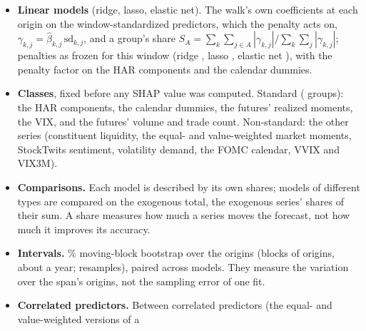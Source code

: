 \begin{itemize}
  forecast, add up to it, and a group's value sums its predictors' values:
  \[
    \hat y_{t,i} = \phi_{k,0} + \sum_{j=1}^{p} \phi_{t,i,j}, \qquad
    \phi_{t,i,A} = \sum_{j \in A} \phi_{t,i,j}, \qquad
    s_A = \frac{I_A}{\sum_{B} I_B}, \quad I_A = \frac{1}{|\mathcal O|} \sum_{(t,i) \in \mathcal O} |\phi_{t,i,A}| ,
  \]
  with $\phi_{k,0}$ the model's expected forecast over its own training sample (the trees' node covers), so no
  background sample is chosen.
\item \textbf{Linear models} (ridge, lasso, elastic net). The walk's own coefficients at each origin on the
  window-standardized predictors, which the penalty acts on, $\gamma_{k,j} = \hat\beta_{k,j}\,\mathrm{sd}_{k,j}$, and
  a group's share $S_A = \sum_k \sum_{j \in A} |\gamma_{k,j}| / \sum_k \sum_{j} |\gamma_{k,j}|$; penalties as frozen
  for this window (ridge \rhfipRidgePen, lasso \rhfipLassoPen, elastic net \rhfipEnetPen), with the penalty factor
  \rhfipHarPf{} on the HAR components and the calendar dummies.
\item \textbf{Classes}, fixed before any SHAP value was computed. Standard (\rhfipNStd{} groups): the HAR components,
  the calendar dummies, the futures' \rhfipNMom{} realized moments, the VIX, and the futures' volume and trade count.
  Non-standard: the other \rhfipNNonStd{} series (constituent liquidity, the equal- and value-weighted market
  moments, StockTwits sentiment, volatility demand, the FOMC calendar, VVIX and VIX3M).
\item \textbf{Comparisons.} Each model is described by its own shares; models of different types are compared on the
  exogenous total, the exogenous series' shares of their sum. A share measures how much a series moves the forecast,
  not how much it improves its accuracy.
\item \textbf{Intervals.} \rhfipCiLevel\% moving-block bootstrap over the origins (blocks of \rhfipBootBlock{}
  origins, about a year; \rhfipBootB{} resamples), paired across models. They measure the variation over the span's
  origins, not the sampling error of one fit.
\item \textbf{Correlated predictors.} Between correlated predictors (the equal- and value-weighted versions of a

\end{itemize}
